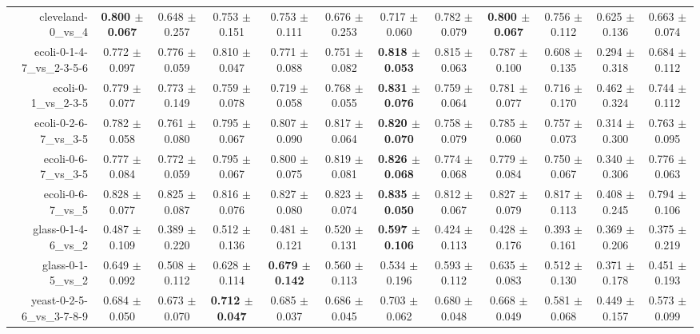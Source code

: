 \begin{table}[!ht]
{\begin{tabular}{r c c c c c c c c c c c}
cleveland-0\_vs\_4 & \textbf{0.800 $\pm$ 0.067} & 0.648 $\pm$ 0.257 & 0.753 $\pm$ 0.151 & 0.753 $\pm$ 0.111 & 0.676 $\pm$ 0.253 & 0.717 $\pm$ 0.060 & 0.782 $\pm$ 0.079 & \textbf{0.800 $\pm$ 0.067} & 0.756 $\pm$ 0.112 & 0.625 $\pm$ 0.136 & 0.663 $\pm$ 0.074 \\
ecoli-0-1-4-7\_vs\_2-3-5-6 & 0.772 $\pm$ 0.097 & 0.776 $\pm$ 0.059 & 0.810 $\pm$ 0.047 & 0.771 $\pm$ 0.088 & 0.751 $\pm$ 0.082 & \textbf{0.818 $\pm$ 0.053} & 0.815 $\pm$ 0.063 & 0.787 $\pm$ 0.100 & 0.608 $\pm$ 0.135 & 0.294 $\pm$ 0.318 & 0.684 $\pm$ 0.112 \\
ecoli-0-1\_vs\_2-3-5 & 0.779 $\pm$ 0.077 & 0.773 $\pm$ 0.149 & 0.759 $\pm$ 0.078 & 0.719 $\pm$ 0.058 & 0.768 $\pm$ 0.055 & \textbf{0.831 $\pm$ 0.076} & 0.759 $\pm$ 0.064 & 0.781 $\pm$ 0.077 & 0.716 $\pm$ 0.170 & 0.462 $\pm$ 0.324 & 0.744 $\pm$ 0.112 \\
ecoli-0-2-6-7\_vs\_3-5 & 0.782 $\pm$ 0.058 & 0.761 $\pm$ 0.080 & 0.795 $\pm$ 0.067 & 0.807 $\pm$ 0.090 & 0.817 $\pm$ 0.064 & \textbf{0.820 $\pm$ 0.070} & 0.758 $\pm$ 0.079 & 0.785 $\pm$ 0.060 & 0.757 $\pm$ 0.073 & 0.314 $\pm$ 0.300 & 0.763 $\pm$ 0.095 \\
ecoli-0-6-7\_vs\_3-5 & 0.777 $\pm$ 0.084 & 0.772 $\pm$ 0.059 & 0.795 $\pm$ 0.067 & 0.800 $\pm$ 0.075 & 0.819 $\pm$ 0.081 & \textbf{0.826 $\pm$ 0.068} & 0.774 $\pm$ 0.068 & 0.779 $\pm$ 0.084 & 0.750 $\pm$ 0.067 & 0.340 $\pm$ 0.306 & 0.776 $\pm$ 0.063 \\
ecoli-0-6-7\_vs\_5 & 0.828 $\pm$ 0.077 & 0.825 $\pm$ 0.087 & 0.816 $\pm$ 0.076 & 0.827 $\pm$ 0.080 & 0.823 $\pm$ 0.074 & \textbf{0.835 $\pm$ 0.050} & 0.812 $\pm$ 0.067 & 0.827 $\pm$ 0.079 & 0.817 $\pm$ 0.113 & 0.408 $\pm$ 0.245 & 0.794 $\pm$ 0.106 \\
glass-0-1-4-6\_vs\_2 & 0.487 $\pm$ 0.109 & 0.389 $\pm$ 0.220 & 0.512 $\pm$ 0.136 & 0.481 $\pm$ 0.121 & 0.520 $\pm$ 0.131 & \textbf{0.597 $\pm$ 0.106} & 0.424 $\pm$ 0.113 & 0.428 $\pm$ 0.176 & 0.393 $\pm$ 0.161 & 0.369 $\pm$ 0.206 & 0.375 $\pm$ 0.219 \\
glass-0-1-5\_vs\_2 & 0.649 $\pm$ 0.092 & 0.508 $\pm$ 0.112 & 0.628 $\pm$ 0.114 & \textbf{0.679 $\pm$ 0.142} & 0.560 $\pm$ 0.113 & 0.534 $\pm$ 0.196 & 0.593 $\pm$ 0.112 & 0.635 $\pm$ 0.083 & 0.512 $\pm$ 0.130 & 0.371 $\pm$ 0.178 & 0.451 $\pm$ 0.193 \\
yeast-0-2-5-6\_vs\_3-7-8-9 & 0.684 $\pm$ 0.050 & 0.673 $\pm$ 0.070 & \textbf{0.712 $\pm$ 0.047} & 0.685 $\pm$ 0.037 & 0.686 $\pm$ 0.045 & 0.703 $\pm$ 0.062 & 0.680 $\pm$ 0.048 & 0.668 $\pm$ 0.049 & 0.581 $\pm$ 0.068 & 0.449 $\pm$ 0.157 & 0.573 $\pm$ 0.099 \\

\end{tabular}}
\end{table}
